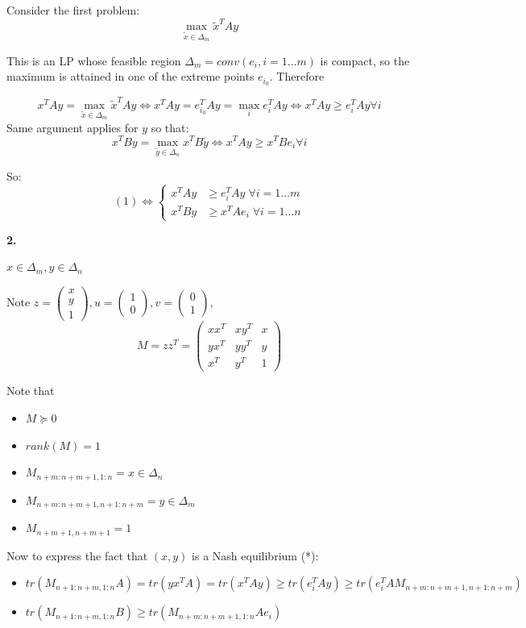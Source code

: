 \documentclass[11pt]{article}
\begin{document}
Consider the first problem:
$$\max_{\tilde x \in \Delta_m} \tilde x^TAy$$

This is an LP whose feasible region   \(\Delta_m = conv(e_i, i=1\ldots m)\) is compact, so the maximum is attained in one of the extreme points \(e_{i_0}\). Therefore 

$$x^TAy = \max_{\tilde x \in \Delta_m} \tilde x^TAy \iff x^TAy = e_{i_0}^TAy = \max_{i} e_i^TAy \iff x^TAy \ge e_i^TAy \forall i$$
Same argument applies for \(y\) so that:
$$x^TBy = \max_{\tilde y \in \Delta_n} x^TB \tilde y  \iff x^TAy \ge x^TBe_i \forall i$$

So: \[(1) \iff \left\{\begin{array}{cc}
  x^TAy &\ge e_i^TAy \; \forall i = 1\ldots m\\
  x^TBy &\ge x^TAe_i \; \forall i = 1\ldots n
  \end{array}\right.\]

\textbf{2.}

\(x \in \Delta_m, y \in \Delta_n\)

Note \(z = \begin{pmatrix}x \\ y\\1\end{pmatrix}, u = \begin{pmatrix}1 \\ 0\end{pmatrix}, v = \begin{pmatrix}0 \\ 1\end{pmatrix}\), 
\[M = zz^T = \begin{pmatrix}xx^T&xy^T&x\\yx^T&yy^T&y\\x^T&y^T&1\end{pmatrix}\]

Note that
\begin{itemize}
\item \(M \succeq 0\)
\item \(rank(M) = 1\)
\item \(M_{n+m:n+m+1, 1:n} = x \in \Delta_n\)
\item \(M_{n+m:n+m+1, n+1:n+m} = y \in \Delta_m\)
\item \(M_{n+m+1, n+m+1} = 1\)
\end{itemize}

Now to express the fact that \((x, y)\) is a Nash equilibrium (*):
\begin{itemize}
\item \(tr(M_{n+1:n+m, 1:n} A) = tr(yx^T A) = tr(x^TAy) \ge tr(e_i^TAy) \ge tr(e_i^TAM_{n+m:n+m+1, n+1:n+m})\)
\item \(tr(M_{n+1:n+m, 1:n} B)  \ge tr(M_{n+m:n+m+1, 1:n}Ae_i)\)
\end{itemize}
\end{document}
